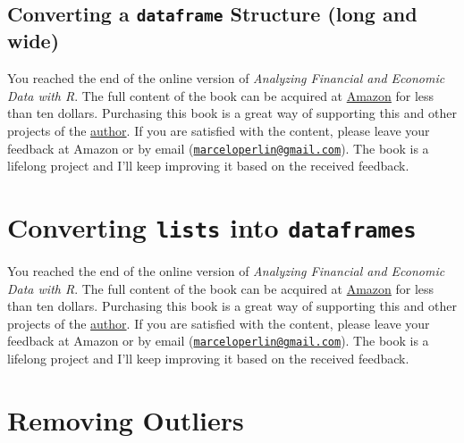 \documentclass[
  12pt,
]{book}
\newenvironment{pleasebuyit}
{\begin{noteblock}
		
	} {\end{noteblock}}
\begin{document}
\hypertarget{converting-a-dataframe-structure-long-and-wide}{%
\subsection{\texorpdfstring{Converting a \texttt{dataframe} Structure (long and wide)}{Converting a dataframe Structure (long and wide)}}\label{converting-a-dataframe-structure-long-and-wide}}

\begin{pleasebuyit}
You reached the end of the online version of \emph{Analyzing Financial
and Economic Data with R}. The full content of the book can be acquired
at \href{https://www.amazon.com/dp/B084LSNXMN}{Amazon} for less than ten
dollars. Purchasing this book is a great way of supporting this and
other projects of the \href{https://www.msperlin.com/blog/}{author}. If
you are satisfied with the content, please leave your feedback at Amazon
or by email
(\href{mailto:marceloperlin@gmail.com}{\nolinkurl{marceloperlin@gmail.com}}).
The book is a lifelong project and I'll keep improving it based on the
received feedback.
\end{pleasebuyit}

\hypertarget{converting-lists-into-dataframes}{%
\section{\texorpdfstring{Converting \texttt{lists} into \texttt{dataframes}}{Converting lists into dataframes}}\label{converting-lists-into-dataframes}}

\begin{pleasebuyit}
You reached the end of the online version of \emph{Analyzing Financial
and Economic Data with R}. The full content of the book can be acquired
at \href{https://www.amazon.com/dp/B084LSNXMN}{Amazon} for less than ten
dollars. Purchasing this book is a great way of supporting this and
other projects of the \href{https://www.msperlin.com/blog/}{author}. If
you are satisfied with the content, please leave your feedback at Amazon
or by email
(\href{mailto:marceloperlin@gmail.com}{\nolinkurl{marceloperlin@gmail.com}}).
The book is a lifelong project and I'll keep improving it based on the
received feedback.
\end{pleasebuyit}

\hypertarget{removing-outliers}{%
\section{Removing Outliers}\label{removing-outliers}}
\end{document}
